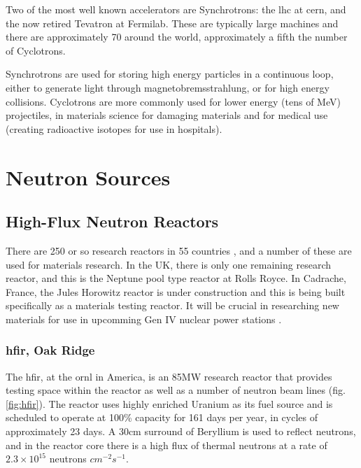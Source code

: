 Two of the most well known accelerators are Synchrotrons: the \acrlong{lhc} at \acrlong{cern}, and the now retired Tevatron at Fermilab.  These are typically large machines and there are approximately 70 around the world\cite{synchrotrons}, approximately a fifth the number of Cyclotrons.  

Synchrotrons are used for storing high energy particles in a continuous loop, either to generate light through magnetobremsstrahlung, or for high energy collisions.  Cyclotrons are more commonly used for lower energy (tens of MeV) projectiles, in materials science for damaging materials and for medical use (creating radioactive isotopes for use in hospitals).












\FloatBarrier
\section{Neutron Sources}

\FloatBarrier
\subsection{High-Flux Neutron Reactors}

There are 250 or so research reactors in 55 countries \cite{researchreactorstats}, and a number of these are used for materials research.  In the UK, there is only one remaining research reactor, and this is the Neptune pool type reactor at Rolls Royce\cite{neptunereactor}.  In Cadrache, France, the Jules Horowitz reactor is under construction and this is being built specifically as a materials testing reactor.  It will be crucial in researching new materials for use in upcomming Gen IV nuclear power stations \cite{researchreactorstats}.  


\FloatBarrier
\subsubsection{\acrlong{hfir}, Oak Ridge}

The \acrlong{hfir}, at the \acrlong{ornl} in America, is an 85MW research reactor that provides testing space within the reactor as well as a number of neutron beam lines (fig. \ref{fig:hfir}).  The reactor uses highly enriched Uranium as its fuel source and is scheduled to operate at 100\% capacity for 161 days per year, in cycles of approximately 23 days.  A 30cm surround of Beryllium is used to reflect neutrons, and in the reactor core there is a high flux of thermal neutrons at a rate of $2.3 \times 10^{15}$ neutrons $cm^{-2} s^{-1}$\cite{hfirornluserguide}.


